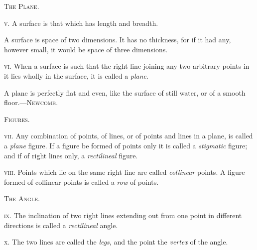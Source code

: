 \documentclass[oneside]{book}
\begin{document}
\begin{center}
\textsc{The Plane.}
\end{center}

\textsc{v.} A surface is that which has length and breadth.

\begin{footnotesize}
A surface is space of two dimensions. It has no thickness, for if
it had any, however small, it would be space of three dimensions.
\par\end{footnotesize}

\textsc{vi.}  When a surface is such that the right line joining
any two arbitrary points in it lies wholly in the
surface, it is called a \textit{plane}.

\begin{footnotesize}
A plane is perfectly flat and even, like the surface of still
water, or of a smooth floor.---\textsc{Newcomb}.
\par\end{footnotesize}

\newpage
\begin{center}
\textsc{Figures.}
\end{center}

\textsc{vii.} Any combination of points, of lines, or of points
and lines in a plane, is called a \textit{plane} figure. If a figure
be formed of points only it is called a \textit{stigmatic} figure;
and if of right lines only, a \textit{rectilineal} figure.

\textsc{viii.} Points which lie on the same right line are
called \textit{collinear} points. A figure formed of collinear
points is called a \textit{row} of points.

\begin{center}
\textsc{The Angle.}
\end{center}

\textsc{ix.} The inclination of two right lines extending out
from one point in different directions is called a \textit{rectilineal}
angle.



\textsc{x.} The two lines are called the \textit{legs}, and the point
the \textit{vertex} of the angle.
\end{document}
